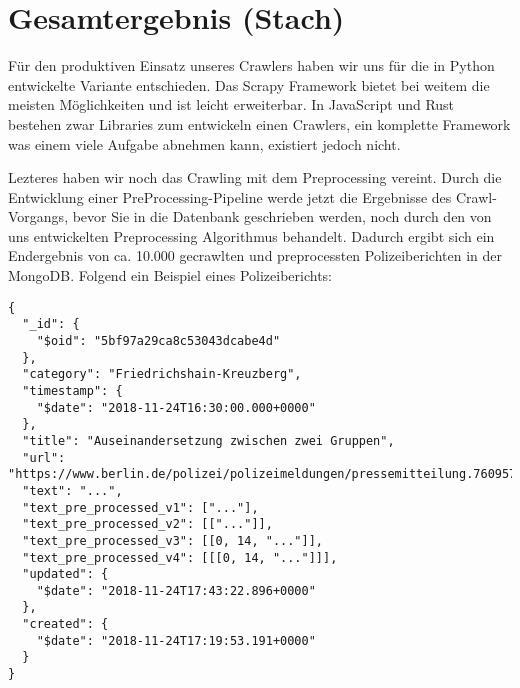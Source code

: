 \chapter{Gesamtergebnis \small{(Stach)}}

Für den produktiven Einsatz unseres Crawlers haben wir uns für die in Python entwickelte Variante entschieden.
Das Scrapy Framework bietet bei weitem die meisten Möglichkeiten und ist leicht erweiterbar.
In JavaScript und Rust bestehen zwar Libraries zum entwickeln einen Crawlers, ein komplette Framework was einem
viele Aufgabe abnehmen kann, existiert jedoch nicht.

Lezteres haben wir noch das Crawling mit dem Preprocessing vereint. Durch die Entwicklung einer PreProcessing-Pipeline
werde jetzt die Ergebnisse des Crawl-Vorgangs, bevor Sie in die Datenbank geschrieben werden, noch durch den von uns
entwickelten Preprocessing Algorithmus behandelt. Dadurch ergibt sich ein Endergebnis von ca. 10.000 gecrawlten und preprocessten
Polizeiberichten in der MongoDB. Folgend ein Beispiel eines Polizeiberichts:


\begin{verbatim}
{
  "_id": {
    "$oid": "5bf97a29ca8c53043dcabe4d"
  },
  "category": "Friedrichshain-Kreuzberg",
  "timestamp": {
    "$date": "2018-11-24T16:30:00.000+0000"
  },
  "title": "Auseinandersetzung zwischen zwei Gruppen",
  "url": "https://www.berlin.de/polizei/polizeimeldungen/pressemitteilung.760957.php",
  "text": "...",
  "text_pre_processed_v1": ["..."],
  "text_pre_processed_v2": [["..."]],
  "text_pre_processed_v3": [[0, 14, "..."]],
  "text_pre_processed_v4": [[[0, 14, "..."]]],
  "updated": {
    "$date": "2018-11-24T17:43:22.896+0000"
  },
  "created": {
    "$date": "2018-11-24T17:19:53.191+0000"
  }
}
\end{verbatim}

